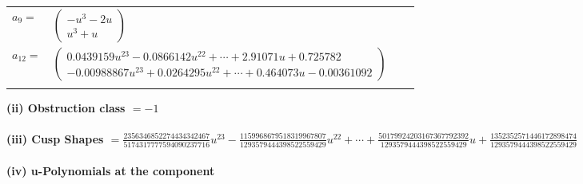 \documentclass[1p]{elsarticle_modified}
\theoremstyle{definition}
\begin{document}
\begin{tabular}{m{7pt} m{180pt} m{7pt} m{180pt} }
\flushright $a_{9}=$&$\begin{pmatrix}- u^3-2 u\\u^3+u\end{pmatrix}$ \\
\flushright $a_{12}=$&$\begin{pmatrix}0.0439159 u^{23}-0.0866142 u^{22}+\cdots+2.91071 u+0.725782\\-0.00988867 u^{23}+0.0264295 u^{22}+\cdots+0.464073 u-0.00361092\end{pmatrix}$\\&\end{tabular}
\flushleft \textbf{(ii) Obstruction class $= -1$}\\~\\
\flushleft \textbf{(iii) Cusp Shapes $= \frac{2356346852274434342467}{5174317777594090237716} u^{23}-\frac{1159968679518319967807}{1293579444398522559429} u^{22}+\cdots+\frac{50179924203167367792392}{1293579444398522559429} u+\frac{1352352571446172898474}{1293579444398522559429}$}\\~\\
\newpage\renewcommand{\arraystretch}{1}
\flushleft \textbf{(iv) u-Polynomials at the component}\newline \\
\end{document}
